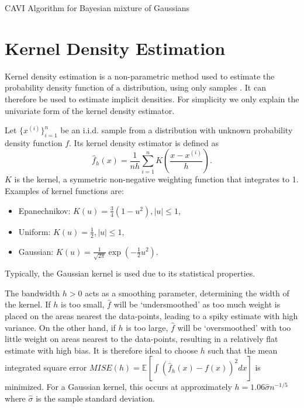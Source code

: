 \documentclass[honours,12pt, twoside]{unswthesis}
\newcommand{\E}{\mathbb{E}}
\numberwithin{equation}{section}
\theoremstyle{definition}
\begin{document}
\begin{algorithm}
\caption{CAVI Algorithm for Bayesian mixture of Gaussians}
\BlankLine
{}
\label{alg:9}
\end{algorithm}
\newpage
\chapter{Kernel Density Estimation}\label{app:D}
Kernel density estimation is a non-parametric method used to estimate the probability density function of a distribution, using only samples \citep{kde}. It can therefore be used to estimate implicit densities. For simplicity we only explain the univariate form of the kernel density estimator.

Let $\{x^{(i)}\}^n_{i=1}$ be an i.i.d. sample from a distribution with unknown probability density function $f$. Its kernel density estimator is defined as
\[\hat{f}_h(x)=\frac{1}{nh}\sum^n_{i=1}K\left(\frac{x-x^{(i)}}{h}\right).\]
$K$ is the kernel, a symmetric non-negative weighting function that integrates to 1. Examples of kernel functions are:
\begin{itemize}
\item Epanechnikov: $K(u)=\frac{3}{4}(1-u^2), |u|\leq 1$,
\item Uniform: $K(u)=\frac12, |u|\leq 1$,
\item Gaussian: $K(u)=\frac{1}{\sqrt{2\pi}}\exp\left(-\frac{1}{2}u^2\right)$.
\end{itemize}
Typically, the Gaussian kernel is used due to its statistical properties.

The bandwidth $h>0$ acts as a smoothing parameter, determining the width of the kernel. If $h$ is too small, $\hat{f}$ will be `undersmoothed' as too much weight is placed on the areas nearest the data-points, leading to a spiky estimate with high variance. On the other hand, if $h$ is too large, $\hat{f}$ will be `oversmoothed' with too little weight on areas nearest to the data-points, resulting in a relatively flat estimate with high bias. It is therefore ideal to choose $h$ such that the mean integrated square error $MISE(h)=\E\left[\int(\hat{f}_h(x)-f(x))^2dx\right]$ is minimized. For a Gaussian kernel, this occurs at approximately $h=1.06\hat{\sigma}n^{-1/5}$ where $\hat{\sigma}$ is the sample standard deviation.
\end{document}
